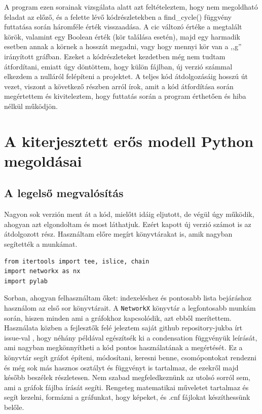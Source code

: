 \documentclass[
]{thesis-ekf}
\theoremstyle{definition}
\theoremstyle{remark}
\begin{document}
	A program ezen sorainak vizsgálata alatt azt feltételeztem, hogy nem megoldható feladat az előző, és a felette lévő kódrészletekben a find\_cycle() függvény futtatása során háromféle érték visszaadása. A cic változó értéke a megtalált körök, valamint egy Boolean érték (kör találása esetén), majd egy harmadik esetben annak a körnek a hosszát megadni, vagy hogy mennyi kör van a ,,g'' irányított gráfban. Ezeket a kódrészleteket kezdetben még nem tudtam átfordítani, emiatt úgy döntöttem, hogy külön fájlban, új verzió számmal elkezdem a nulláról felépíteni a projektet. A teljes kód átdolgozásáig hosszú út vezet, viszont a következő részben arról írok, amit a kód átfordítása során megértettem és kiviteleztem, hogy futtatás során a program érthetően és hiba nélkül működjön.
	
	\section{A kiterjesztett erős modell Python megoldásai}
	\subsection{A legelső megvalósítás}
	
	Nagyon sok verzión ment át a kód, mielőtt idáig eljutott, de végül úgy működik, ahogyan azt elgondoltam és most láthatjuk. Ezért kapott új verzió számot is az átdolgozott rész. Használtam előre megírt könyvtárakat is, amik nagyban segítették a munkámat.

	\begin{lstlisting}
from itertools import tee, islice, chain
import networkx as nx
import pylab
	\end{lstlisting}

	Sorban, ahogyan felhasználtam őket: indexeléshez és pontosabb lista bejáráshoz használom az első sor könyvtárait. A \texttt{NetworkX} könyvtár a legfontosabb munkám során, hiszen minden ami a gráfokhoz kapcsolódik, azt ebből merítettem. Használata közben a fejlesztők felé jeleztem saját github repository-jukba írt issue-val \cite{git-issue-for-examples}, hogy néhány példával egészítsék ki a condensation függvényük leírását, ami nagyban megkönnyítheti a kód pontos használatának a megértését. Ez a könyvtár segít gráfot építeni, módosítani, keresni benne, csomópontokat rendezni és még sok más hasznos osztályt és függvényt is tartalmaz, de ezekről majd később beszélek részletesen. Nem szabad megfeledkeznünk az utolsó sorról sem, ami a gráfok fájlba írását segíti. Rengeteg matematikai műveletet tartalmaz és segít kezelni, formázni a gráfunkat, hogy képeket, és .cnf fájlokat készíthessünk belőle.
	
\end{document}
